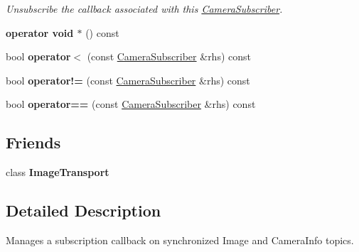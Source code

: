 \begin{DoxyCompactItemize}
\begin{DoxyCompactList}\small\item\em Unsubscribe the callback associated with this \hyperlink{classimage__transport_1_1_camera_subscriber}{Camera\-Subscriber}. \end{DoxyCompactList}\item 
\hypertarget{classimage__transport_1_1_camera_subscriber_af753258daaf280c67bf1c1100bfeb4e4}{{\bfseries operator void $\ast$} () const }\label{classimage__transport_1_1_camera_subscriber_af753258daaf280c67bf1c1100bfeb4e4}

\item 
\hypertarget{classimage__transport_1_1_camera_subscriber_a25fa242f09f9b59190553c73a00ea648}{bool {\bfseries operator$<$} (const \hyperlink{classimage__transport_1_1_camera_subscriber}{Camera\-Subscriber} \&rhs) const }\label{classimage__transport_1_1_camera_subscriber_a25fa242f09f9b59190553c73a00ea648}

\item 
\hypertarget{classimage__transport_1_1_camera_subscriber_ad3d21acca9718dc8ef5367bd4eb136b7}{bool {\bfseries operator!=} (const \hyperlink{classimage__transport_1_1_camera_subscriber}{Camera\-Subscriber} \&rhs) const }\label{classimage__transport_1_1_camera_subscriber_ad3d21acca9718dc8ef5367bd4eb136b7}

\item 
\hypertarget{classimage__transport_1_1_camera_subscriber_af90db2cfc2ca0a99f543c5dbd4f7d216}{bool {\bfseries operator==} (const \hyperlink{classimage__transport_1_1_camera_subscriber}{Camera\-Subscriber} \&rhs) const }\label{classimage__transport_1_1_camera_subscriber_af90db2cfc2ca0a99f543c5dbd4f7d216}

\end{DoxyCompactItemize}
\subsection*{Friends}
\begin{DoxyCompactItemize}
\item 
\hypertarget{classimage__transport_1_1_camera_subscriber_ac010f5a40d98825199e1c5303d0638eb}{class {\bfseries Image\-Transport}}\label{classimage__transport_1_1_camera_subscriber_ac010f5a40d98825199e1c5303d0638eb}

\end{DoxyCompactItemize}


\subsection{Detailed Description}
Manages a subscription callback on synchronized Image and Camera\-Info topics. 


